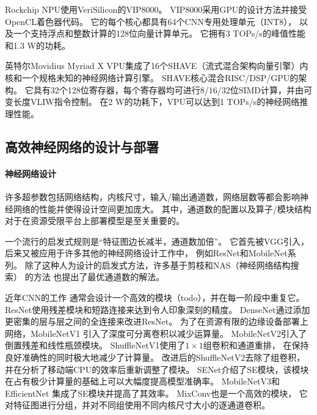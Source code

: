 Rockchip NPU\cite{rk3399pro}使用VeriSilicon的VIP8000。
VIP8000采用GPU的设计方法并接受OpenCL着色器代码。
它的每个核心都具有64个CNN专用处理单元（INT8），
以及一个支持浮点和整数计算的128位向量计算单元。
它拥有3 TOPs/s的峰值性能和1.3 W的功耗。

英特尔Movidius Myriad X VPU集成了16个SHAVE（流式混合架构向量引擎）内核和一个规格未知的神经网络计算引擎。
SHAVE核心\cite{shave}混合RISC/DSP/GPU的架构。
它具有32个128位寄存器，每个寄存器均可进行8/16/32位SIMD计算，并由可变长度VLIW指令控制。
在2 W的功耗下，VPU可以达到1 TOPs/s的神经网络推理性能。

\subsection{高效神经网络的设计与部署}
\label{nn design and deployment}

\paragraph{神经网络设计}
许多超参数包括网络结构，内核尺寸，输入/输出通道数，网络层数等都会影响神经网络的性能并使得设计空间更加庞大。
其中，通道数的配置以及算子/模块结构对于在资源受限平台上部署模型是至关重要的。

一个流行的启发式规则是``特征图边长减半，通道数加倍''。
它首先被VGG\cite{simonyan2014very}引入，
后来又被应用于许多其他的神经网络设计工作中，
例如ResNet\cite{he2016deep}和MobileNet\cite{howard2017mobilenets, sandler2018mobilenetv2}系列。
除了这种人为设计的启发式方法，许多基于剪枝和NAS（神经网络结构搜索）
\cite{he2018amc, lee2019device, liu2019metapruning}的方法
也提出了最优通道数的解法。

近年CNN的工作\cite{he2016deep, ma2018shufflenet, sandler2018mobilenetv2}
通常会设计一个高效的模块（todo），并在每一阶段中重复它。
ResNet\cite{he2016deep}使用残差模块和短路连接来达到令人印象深刻的精度。
DenseNet\cite{huang2017densely}通过添加更密集的层与层之间的全连接来改进ResNet。
为了在资源有限的边缘设备部署上网络，MobileNetV1\cite{howard2017mobilenets}
引入了深度可分离卷积以减少运算量。
MobileNetV2\cite{sandler2018mobilenetv2}引入了倒置残差和线性瓶颈模块。
ShuffleNetV1\cite{zhang2018shufflenet}使用了$1\times 1$组卷积和通道重排，
在保持良好准确性的同时极大地减少了计算量。
改进后的ShuffleNetV2\cite{ma2018shufflenet}去除了组卷积，
并在分析了移动端CPU的效率后重新调整了模块。
SENet\cite{hu2018squeeze}介绍了SE模块，该模块在占有极少计算量的基础上可以大幅度提高模型准确率。
MobileNetV3\cite{howard2019searching}和EfficientNet\cite{tan2019efficientnet}
集成了SE模块并提高了其效率。
MixConv\cite{tan2019mixconv}也是一个高效的模块，
它对特征图进行分组，并对不同组使用不同内核尺寸大小的逐通道卷积。

